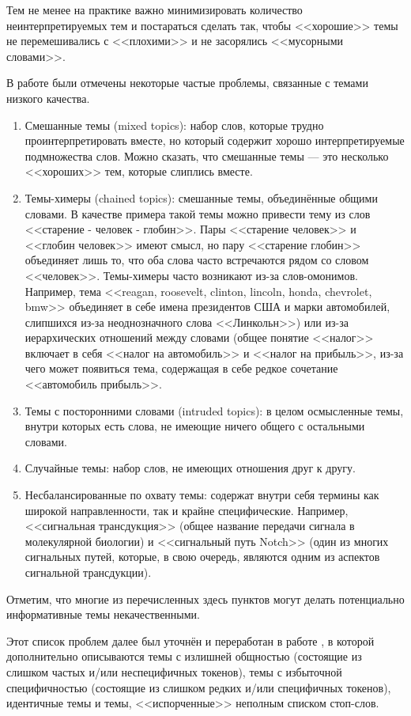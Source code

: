 Тем не менее на практике важно минимизировать количество неинтерпретируемых тем и постараться сделать так, чтобы <<хорошие>> темы не перемешивались с <<плохими>> и не засорялись <<мусорными словами>>.

В работе \cite{mimno2011} были отмечены некоторые частые проблемы, связанные с темами низкого качества.
\begin{enumerate}
\item{Смешанные темы (mixed topics): набор слов, которые трудно проинтерпретировать вместе, но который содержит хорошо интерпретируемые подмножества слов. Можно сказать, что смешанные темы --- это несколько <<хороших>> тем, которые слиплись вместе.}
\item{Темы-химеры (chained topics): смешанные темы, объединённые общими словами. В качестве примера такой темы можно привести тему из слов <<старение - человек - глобин>>. Пары <<старение человек>> и <<глобин человек>> имеют смысл, но пару <<старение глобин>> объединяет лишь то, что оба слова часто встречаются рядом со словом <<человек>>. Темы-химеры часто возникают из-за слов-омонимов. Например, тема <<reagan, roosevelt, clinton, lincoln, honda, chevrolet, bmw>> объединяет в себе имена президентов США и марки автомобилей, слипшихся из-за неоднозначного слова <<Линкольн>>) или из-за иерархических отношений между словами (общее понятие <<налог>> включает в себя <<налог на автомобиль>> и <<налог на прибыль>>, из-за чего может появиться тема, содержащая в себе редкое сочетание <<автомобиль прибыль>>.}
\item{Темы с посторонними словами (intruded topics): в целом осмысленные темы, внутри которых есть слова, не имеющие ничего общего с остальными словами.}
\item{Случайные темы: набор слов, не имеющих отношения друг к другу.}
\item{Несбалансированные по охвату темы: содержат внутри себя термины как широкой направленности, так и крайне специфические. Например, <<сигнальная трансдукция>> (общее название передачи сигнала в молекулярной биологии) и <<сигнальный путь Notch>> (один из многих сигнальных путей, которые, в свою очередь, являются одним из аспектов сигнальной трансдукции).}
\end{enumerate}

Отметим, что многие из перечисленных здесь пунктов могут делать потенциально информативные темы некачественными.

Этот список проблем далее был уточнён и переработан в работе \cite{boydcare}, в которой дополнительно описываются темы с излишней общностью (состоящие из слишком частых и/или неспецифичных токенов), темы с избыточной специфичностью (состоящие из слишком редких и/или специфичных токенов), идентичные темы и темы, <<испорченные>> неполным списком стоп-слов.

